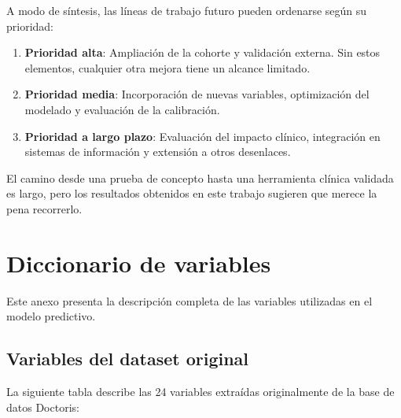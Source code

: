 \documentclass[12pt, a4paper, oneside]{report}
\begin{document}
A modo de síntesis, las líneas de trabajo futuro pueden ordenarse según su prioridad:

\begin{enumerate}
    \item \textbf{Prioridad alta}: Ampliación de la cohorte y validación externa. Sin estos elementos, cualquier otra mejora tiene un alcance limitado.
    
    \item \textbf{Prioridad media}: Incorporación de nuevas variables, optimización del modelado y evaluación de la calibración.
    
    \item \textbf{Prioridad a largo plazo}: Evaluación del impacto clínico, integración en sistemas de información y extensión a otros desenlaces.
\end{enumerate}

El camino desde una prueba de concepto hasta una herramienta clínica validada es largo, pero los resultados obtenidos en este trabajo sugieren que merece la pena recorrerlo.

\newpage
\printbibliography[heading=bibintoc, title={Referencias Bibliográficas}]

\appendix
\chapter{Diccionario de variables}
\label{anexo:diccionario}

Este anexo presenta la descripción completa de las variables utilizadas en el modelo predictivo.

\section{Variables del dataset original}

La siguiente tabla describe las 24 variables extraídas originalmente de la base de datos Doctoris:
\end{document}
